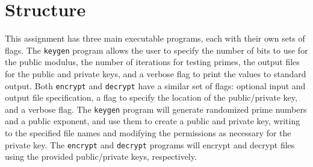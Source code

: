 \documentclass[12pt]{article}
\begin{document}
\section{Structure}

This assignment has three main executable programs, each with their own sets of flags. The \verb|keygen| program allows the user to specify the number of bits to use for the public modulus, the number of iterations for testing primes, the output files for the public and private keys, and a verbose flag to print the values to standard output. Both \verb|encrypt| and \verb|decrypt| have a similar set of flags: optional input and output file specification, a flag to specify the location of the public/private key, and a verbose flag.
The \verb|keygen| program will generate randomized prime numbers and a public exponent, and use them to create a public and private key, writing to the specified file names and modifying the permissions as necessary for the private key. The \verb|encrypt| and \verb|decrypt| programs will encrypt and decrypt files using the provided public/private keys, respectively.
\end{document}
